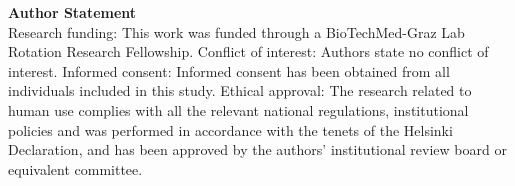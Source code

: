 \documentclass[USenglish,twocolumn]{article}
\begin{document}

  \textsf{\textbf{Author Statement}}\\
  Research funding: This work was funded through a BioTechMed-Graz Lab Rotation Research Fellowship.
  Conflict of interest: Authors state no conflict of interest.
  Informed consent: Informed consent has been obtained from all individuals included in this study.
  Ethical approval: The research related to human use complies with all the relevant national regulations, institutional policies and was performed in accordance with the tenets of the Helsinki Declaration, and has been approved by the authors' institutional review board or equivalent committee.

  \printbibliography
\end{document}
